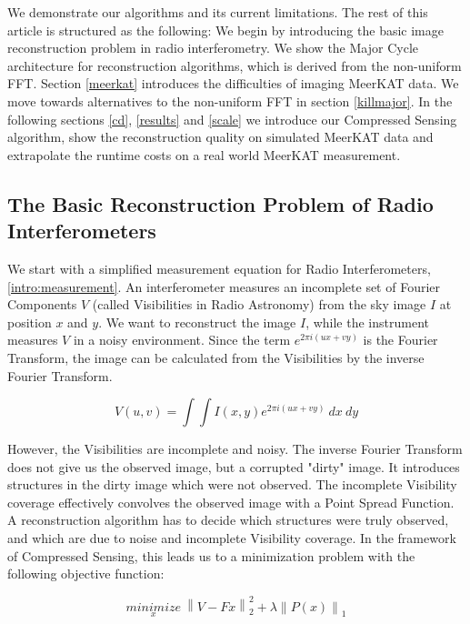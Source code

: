 We demonstrate our algorithms and its current limitations. The rest of this article is structured as the following: We begin by introducing the basic image reconstruction problem in radio interferometry. We show the Major Cycle architecture for reconstruction algorithms, which is derived from the non-uniform FFT.  Section \ref{meerkat} introduces the difficulties of imaging MeerKAT data. We  move towards alternatives to the non-uniform FFT in section \ref{killmajor}. In the following sections \ref{cd}, \ref{results} and \ref{scale} we introduce our Compressed Sensing algorithm, show the reconstruction quality on simulated MeerKAT data and extrapolate the runtime costs on a real world MeerKAT measurement.


\subsection{The Basic Reconstruction Problem of Radio Interferometers}\label{intro:basic}
We start with a simplified measurement equation for Radio Interferometers, \eqref{intro:measurement}. An interferometer measures an incomplete set of Fourier Components $V$ (called Visibilities in Radio Astronomy) from the sky image $I$ at position $x$ and $y$. We want to reconstruct the image $I$, while the instrument measures $V$ in a noisy environment. Since the term $e^{2 \pi i (ux+vy)}$ is the Fourier Transform, the image can be calculated from the Visibilities by the inverse Fourier Transform.

\begin{equation}\label{intro:measurement}
V(u, v) = \int\int I(x, y) e^{2 \pi i (ux+vy)} \: dx \: dy
\end{equation}

However, the Visibilities are incomplete and noisy. The inverse Fourier Transform does not give us the observed image, but a corrupted "dirty" image.  It introduces structures in the dirty image which were not observed. The incomplete Visibility coverage effectively convolves the observed image with a Point Spread Function. A reconstruction algorithm has to decide which structures were truly observed, and which are due to noise and incomplete Visibility coverage. In the framework of Compressed Sensing, this leads us to a minimization problem with the following objective function:

\begin{equation}\label{intro:cs}
\underset{x}{minimize} \: \left \| V - Fx \right \|_2^2 + \lambda \left \| P(x) \right \|_1
\end{equation}


